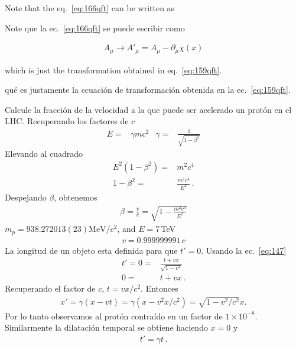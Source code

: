 \begin{english}
Note that the eq.~\eqref{eq:166qft} can be written as  
\end{english}
\begin{spanish}
Note que la ec.~\eqref{eq:166qft} se puede escribir como
\end{spanish}

\begin{align}
\label{eq:168qft}
  A_\mu\to A'_\mu=A_\mu-\partial_\mu\chi(x)
\end{align}
\begin{english}
which is just the transformation obtained in eq.~\eqref{eq:159qft}.  
\end{english}
\begin{spanish} %
qu\'e es justamente la ecuaci\'on de transformaci\'on obtenida en la ec.~\eqref{eq:159qft}.  
\end{spanish}


\begin{example}
  Calcule la fracci\'on de la velocidad a la que puede ser acelerado un prot\'on en el LHC.
Recuperando los factores de $c$
  \begin{align*}
  E=&\gamma m c^2&  \gamma=&\frac{1}{\sqrt{1-\beta^2}}
\end{align*}
Elevando al cuadrado
\begin{align}
  E^2(1-\beta^2)=&m^2c^4 \nonumber\\
1-\beta^2=&\frac{m^2c^4}{E^2}\,.
\end{align}
Despejando $\beta$, obtenemos
\begin{align*}
  \beta=\frac{v}{c}=\sqrt{1-\frac{m^2 c^4}{E^2}}
\end{align*}
$m_p=938.272013(23) {\text{MeV}}/{c^2}$, and $E=7\,$TeV
\begin{align*}
  v=0.999999991\,c
\end{align*}
La longitud de un objeto esta definida para que $t'=0$. Usando la ec.~\eqref{eq:147} 
\begin{align}
  t'=0=&\frac{t+vx}{\sqrt{1-v^2}} \nonumber\\
     0=&t+vx\,.
\end{align}
Recuperando el factor de $c$,
 $t=v x/c^2$. Entonces
\begin{align}
  x'=\gamma(x-v t)=\gamma(x-v^2 x/c^2)=\sqrt{1-v^2/c^2}x.
\end{align}
Por lo tanto observamos al protón contraído en un factor de $1\times10^{-8}$.  Similarmente la dilataci\'on temporal se obtiene haciendo $x=0$ y
\begin{align}
  t'=\gamma t\,.
\end{align}
\end{example}

